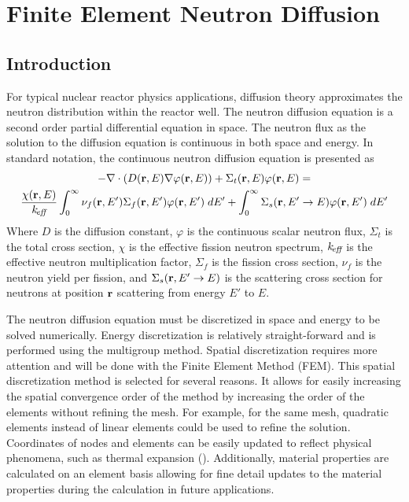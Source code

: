 \chapter{Finite Element Neutron Diffusion}
\label{ch:neutronDiffusion}

\section{Introduction}
  For typical nuclear reactor physics applications, diffusion theory
  approximates the neutron distribution within the reactor well. The neutron 
  diffusion equation is a second order partial differential equation in space.
  The neutron flux as the solution to the diffusion equation is continuous in
  both space and energy. In standard notation, the continuous neutron diffusion
  equation is presented as
  \begin{multline}\label{eq:continuous_diffusion}
    -\mathbf{\nabla} \cdot (D(\mathbf{r},E) \mathbf{\nabla} \varphi(\mathbf{r},E)) + \Sigma_t(\mathbf{r},E) 
      \varphi(\mathbf{r},E) = \\
      \frac{\chi(\mathbf{r},E)}{k_{\!\mbox{\scriptsize \em eff}}} \int_0^{\infty} \nu_f(\mathbf{r},E') \Sigma_f(\mathbf{r},E') 
      \varphi(\mathbf{r},E') \; dE' + \int_0^{\infty} \Sigma_s(\mathbf{r},E' \rightarrow E) 
      \varphi(\mathbf{r},E') \; dE'
  \end{multline}
  Where $D$ is the diffusion constant, $\varphi$ is the continuous scalar 
  neutron flux, $\Sigma_t$ is the total cross section, $\chi$ is the effective 
  fission neutron spectrum, $k_{\!\mbox{\scriptsize \em eff}}$ is the effective neutron multiplication 
  factor, $\Sigma_f$ is the fission cross section, $\nu_f$ is the neutron yield 
  per fission, and $\Sigma_s(\mathbf{r},E' \rightarrow E)$ is the scattering cross 
  section for neutrons at position $\mathbf{r}$ scattering from energy $E'$ to $E$.
  
  The neutron diffusion equation must be discretized in space and 
  energy to be solved numerically. Energy discretization is relatively 
  straight-forward and is performed using the multigroup method. Spatial 
  discretization requires more attention and will be done with the Finite 
  Element Method (FEM). This spatial discretization method is selected for 
  several reasons. It allows for easily increasing the spatial convergence order
  of the method by increasing the order of the elements without refining the
  mesh. For example, for the same mesh, quadratic elements instead of linear
  elements could be used to refine the solution. Coordinates of nodes and 
  elements can be easily updated to reflect physical phenomena, such as thermal 
  expansion (). Additionally, material properties are 
  calculated on an element basis allowing for fine detail updates to the 
  material properties during the calculation in future applications.

